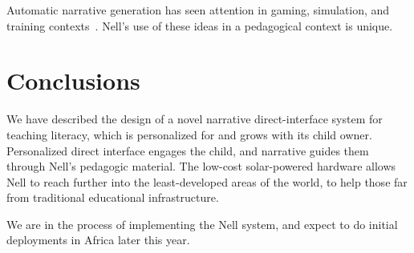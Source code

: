 \documentclass[preprint]{sig-alternate}
\begin{document}

Automatic narrative generation has seen attention in
gaming, simulation, and training contexts~\cite{riedl:2008}.  Nell's
use of these ideas in a pedagogical context is unique.

\section{Conclusions}
We have described the design of a novel narrative direct-interface
system for teaching literacy, which is personalized for and grows with
its child owner.  Personalized direct interface engages the child, and
narrative guides them through Nell's pedagogic material.  The low-cost
solar-powered hardware allows Nell to reach further into the
least-developed areas of the world, to help those far from traditional
educational infrastructure.

We are in the process of implementing the Nell system, and expect to
do initial deployments in Africa later this year.



%

%
%
\balancecolumns
\end{document}
